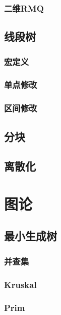 \documentclass[twocolumn,a4]{article}%
\begin{document}
    \subsubsection{二维RMQ}
    
\subsection{线段树}
    \subsubsection{宏定义}
    
    \subsubsection{单点修改}
    
    \subsubsection{区间修改}
    
\subsection{分块}

\subsection{离散化}

\section{图论}
\subsection{最小生成树}
    \subsubsection{并查集}
    
    \subsubsection{Kruskal}
    
    \subsubsection{Prim}
    
\end{document}
